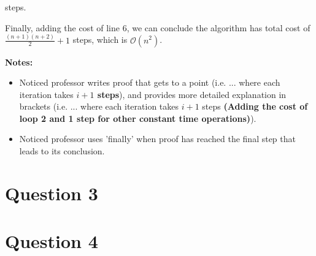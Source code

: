 \documentclass[12pt]{article}
\begin{document}
\begin{enumerate}[a.]
\begin{mdframed}
        steps.

        \bigskip

        Finally, adding the cost of line 6, we can conclude the algorithm has total
        cost of $\frac{(n+1)(n+2)}{2} + 1$ steps, which is $\mathcal{O}(n^2)$.
        \color{black}
    \end{mdframed}

    \bigskip

    \textbf{Notes:}

    \begin{itemize}
        \item Noticed professor writes proof that gets to a point (i.e. ... where
        each iteration takes \textbf{$i + 1$ steps}), and provides more detailed explanation
        in brackets (i.e. ... where each iteration takes $i + 1$ steps \textbf{(Adding
        the cost of loop 2 and 1 step for other constant time operations)}).

        \item Noticed professor uses 'finally' when proof has reached the final
        step that leads to its conclusion.
    \end{itemize}

\end{enumerate}

\section*{Question 3}

\section*{Question 4}
\end{document}
